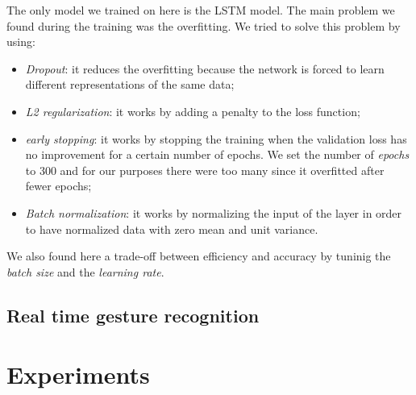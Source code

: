 \documentclass[10pt,twocolumn,letterpaper]{article}
\begin{document}
The only model we trained on here is the LSTM model. The main problem we found during the training 
was the overfitting. We tried to solve this problem by using:
\begin{itemize}
   \item \textit{Dropout}: it reduces the overfitting because the network is forced to learn different representations of the same data;
   \item \textit{L2 regularization}: it works by adding a penalty to the loss function;
   \item \textit{early stopping}: it works by stopping the training when the validation loss 
   has no improvement for a certain number of epochs. We set the number of \textit{epochs} to 
   300 and for our purposes there were too many since it overfitted after fewer epochs;
   \item \textit{Batch normalization}: it works by normalizing the input of the layer in order to have normalized data with zero mean and unit variance.
\end{itemize}
We also found here a trade-off between efficiency and accuracy by tuninig 
the \textit{batch size} and the \textit{learning rate}.





\subsection{Real time gesture recognition}

\section{Experiments}
\end{document}
